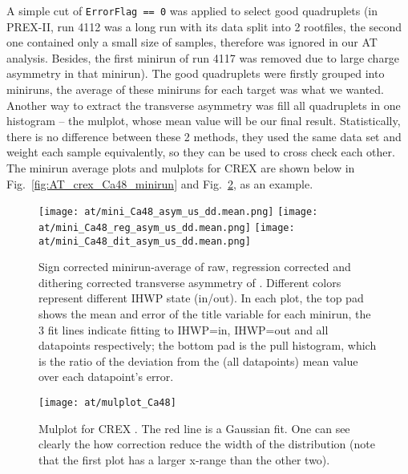 A simple cut of \verb|ErrorFlag == 0| was applied to select good quadruplets 
(in PREX-II, run 4112 was a long run with its data split into 2 rootfiles, the
second one contained only a small size of samples, therefore was ignored in our AT analysis.
Besides, the first minirun of run 4117 was removed due to large charge asymmetry
in that minirun). The good quadruplets were firstly grouped into miniruns, 
the average of these miniruns for each target was what we wanted. 
Another way to extract the transverse asymmetry was fill 
all quadruplets in one histogram -- the mulplot, whose mean value will be
our final result. Statistically, there is no difference between these 2 methods,
they used the same data set and weight each sample equivalently, so they can
be used to cross check each other. The minirun average plots and mulplots for
CREX \Ca are shown below in Fig.~\ref{fig:AT_crex_Ca48_minirun} and 
Fig.~\ref{fig:AT_crex_Ca48_mulplot}, as an example.

\begin{figure}[H]
    \centering
    \texttt{[image: at/mini\_Ca48\_asym\_us\_dd.mean.png]}
    \texttt{[image: at/mini\_Ca48\_reg\_asym\_us\_dd.mean.png]}
    \texttt{[image: at/mini\_Ca48\_dit\_asym\_us\_dd.mean.png]}
    \caption{Sign corrected minirun-average of raw, regression corrected and 
    dithering corrected transverse asymmetry of \Ca. Different colors represent
    different IHWP state (in/out). In each plot, the top pad shows the 
    mean and error of the title variable for each minirun, the 3 fit lines indicate
    fitting to IHWP=in, IHWP=out and all datapoints respectively;
    the bottom pad is the pull histogram, which is the ratio of the deviation 
    from the (all datapoints) mean value over each datapoint's error.
    }
    \label{fig:AT_crex_Ca48_miniruns}
\end{figure}

\begin{figure}[H]
    \centering
    \texttt{[image: at/mulplot\_Ca48]}
    \caption{Mulplot for CREX \Ca. The red line is a Gaussian fit. One can see 
    clearly the how correction reduce the width of the distribution (note that
    the first plot has a larger x-range than the other two).}
    \label{fig:AT_crex_Ca48_mulplot}
\end{figure}

